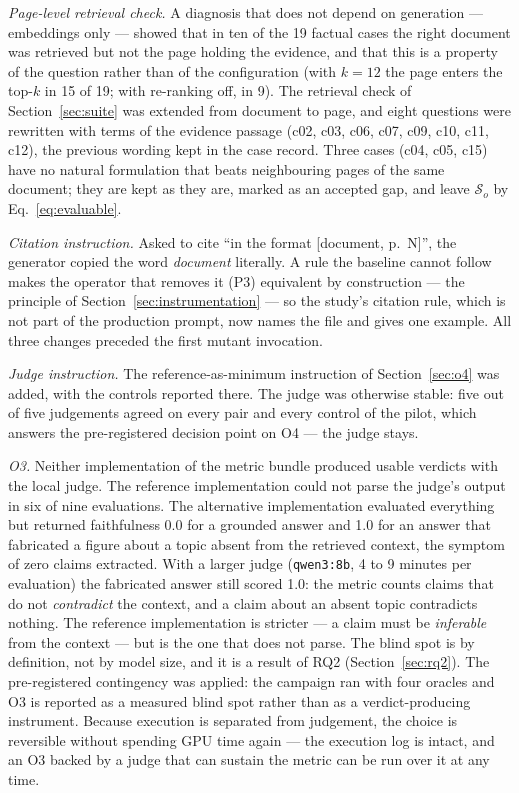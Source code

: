 \documentclass[a4paper,fleqn]{cas-dc}
\newcommand{\Sset}{\mathcal{S}}
\newcommand{\code}[1]{\texttt{#1}}
\begin{document}
\emph{Page-level retrieval check.} A diagnosis that does not depend on
generation --- embeddings only --- showed that in ten of the 19 factual cases
the right document was retrieved but not the page holding the evidence, and
that this is a property of the question rather than of the configuration
(with $k = 12$ the page enters the top-$k$ in 15 of 19; with re-ranking off,
in 9). The retrieval check of Section~\ref{sec:suite} was extended from
document to page, and eight questions were rewritten with terms of the
evidence passage (c02, c03, c06, c07, c09, c10, c11, c12), the previous
wording kept in the case record. Three cases (c04, c05, c15) have no natural
formulation that beats neighbouring pages of the same document; they are kept
as they are, marked as an accepted gap, and leave $\Sset_o$ by
Eq.~\eqref{eq:evaluable}.

\emph{Citation instruction.} Asked to cite ``in the format [document, p.~N]'',
the generator copied the word \emph{document} literally. A rule the baseline
cannot follow makes the operator that removes it (P3) equivalent by
construction --- the principle of Section~\ref{sec:instrumentation} --- so the
study's citation rule, which is not part of the production prompt, now names
the file and gives one example. All three changes preceded the first mutant
invocation.

\emph{Judge instruction.} The reference-as-minimum instruction of
Section~\ref{sec:o4} was added, with the controls reported there. The judge
was otherwise stable: five out of five judgements agreed on every pair and
every control of the pilot, which answers the pre-registered decision point on
O4 --- the judge stays.

\emph{O3.} Neither implementation of the metric bundle produced usable
verdicts with the local judge. The reference implementation could not parse
the judge's output in six of nine evaluations. The alternative implementation
evaluated everything but returned faithfulness 0.0 for a grounded answer and
1.0 for an answer that fabricated a figure about a topic absent from the
retrieved context, the symptom of zero claims extracted. With a larger judge
(\code{qwen3:8b}, 4 to 9 minutes per evaluation) the fabricated answer still
scored 1.0: the metric counts claims that do not \emph{contradict} the
context, and a claim about an absent topic contradicts nothing. The reference
implementation is stricter --- a claim must be \emph{inferable} from the
context --- but is the one that does not parse. The blind spot is by
definition, not by model size, and it is a result of RQ2
(Section~\ref{sec:rq2}). The pre-registered contingency was applied: the
campaign ran with four oracles and O3 is reported as a measured blind spot
rather than as a verdict-producing instrument. Because execution is separated
from judgement, the choice is reversible without spending GPU time again ---
the execution log is intact, and an O3 backed by a judge that can sustain the
metric can be run over it at any time.
\end{document}
